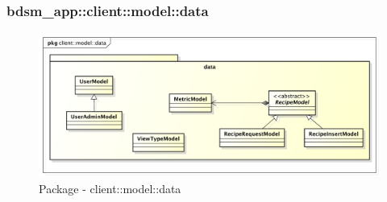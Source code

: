 %

%

\subsubsection{bdsm\_app::client::model::data} %
\label{ssub:bdsm_app_client_model_data}
\begin{figure}[htbp]
	\centering
	\centerline{\includegraphics[scale=0.5]{./images/client_model_data.pdf}}
	\caption{Package - client::model::data}
\end{figure}


